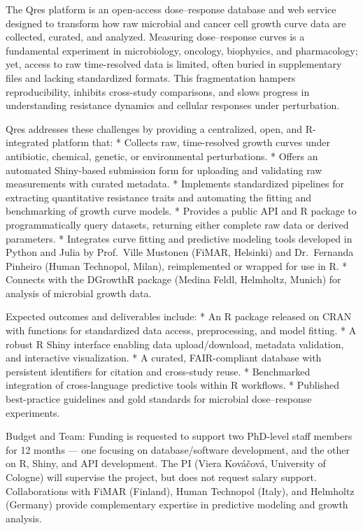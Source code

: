 \documentclass[
]{article}
\begin{document}
The Qres platform is an open-access dose--response database and web
service designed to transform how raw microbial and cancer cell growth
curve data are collected, curated, and analyzed. Measuring
dose--response curves is a fundamental experiment in microbiology,
oncology, biophysics, and pharmacology; yet, access to raw time-resolved
data is limited, often buried in supplementary files and lacking
standardized formats. This fragmentation hampers reproducibility,
inhibits cross-study comparisons, and slows progress in understanding
resistance dynamics and cellular responses under perturbation.

Qres addresses these challenges by providing a centralized, open, and
R-integrated platform that: * Collects raw, time-resolved growth curves
under antibiotic, chemical, genetic, or environmental perturbations. *
Offers an automated Shiny-based submission form for uploading and
validating raw measurements with curated metadata. * Implements
standardized pipelines for extracting quantitative resistance traits and
automating the fitting and benchmarking of growth curve models. *
Provides a public API and R package to programmatically query datasets,
returning either complete raw data or derived parameters. * Integrates
curve fitting and predictive modeling tools developed in Python and
Julia by Prof.~Ville Mustonen (FiMAR, Helsinki) and Dr.~Fernanda
Pinheiro (Human Technopol, Milan), reimplemented or wrapped for use in
R. * Connects with the DGrowthR package (Medina Feldl, Helmholtz,
Munich) for analysis of microbial growth data.

Expected outcomes and deliverables include: * An R package released on
CRAN with functions for standardized data access, preprocessing, and
model fitting. * A robust R Shiny interface enabling data
upload/download, metadata validation, and interactive visualization. * A
curated, FAIR-compliant database with persistent identifiers for
citation and cross-study reuse. * Benchmarked integration of
cross-language predictive tools within R workflows. * Published
best-practice guidelines and gold standards for microbial dose--response
experiments.

Budget and Team: Funding is requested to support two PhD-level staff
members for 12 months --- one focusing on database/software development,
and the other on R, Shiny, and API development. The PI (Viera Kováčová,
University of Cologne) will supervise the project, but does not request
salary support. Collaborations with FiMAR (Finland), Human Technopol
(Italy), and Helmholtz (Germany) provide complementary expertise in
predictive modeling and growth analysis.
\end{document}
